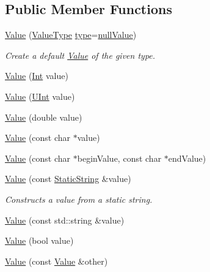 \subsection*{Public Member Functions}
\begin{DoxyCompactItemize}
\item 
\hyperlink{classJson_1_1Value_ada6ba1369448fb0240bccc36efaa46f7}{Value} (\hyperlink{namespaceJson_a7d654b75c16a57007925868e38212b4e}{Value\-Type} \hyperlink{classJson_1_1Value_a695ef31fad36b4712918b3ff80158479}{type}=\hyperlink{namespaceJson_a7d654b75c16a57007925868e38212b4ea99922f3ccd58446e80e6055a7119b640}{null\-Value})
\begin{DoxyCompactList}\small\item\em Create a default \hyperlink{classJson_1_1Value}{Value} of the given type. \end{DoxyCompactList}\item 
\hyperlink{classJson_1_1Value_a4744ae571fcf34f4b16a2257b3b3b585}{Value} (\hyperlink{classJson_1_1Value_abdf7a7ff73eb130ffcab28504ffdb405}{Int} value)
\item 
\hyperlink{classJson_1_1Value_ae67a857b01286e3499a87e95be848d20}{Value} (\hyperlink{classJson_1_1Value_a0933d59b45793ae4aade1757c322a98d}{U\-Int} value)
\item 
\hyperlink{classJson_1_1Value_a32228cc84d83200cca8441451997996c}{Value} (double value)
\item 
\hyperlink{classJson_1_1Value_ad87b849356816aca75995dd07302e49d}{Value} (const char $\ast$value)
\item 
\hyperlink{classJson_1_1Value_a13e567d467bb1e699d71e27a76b0e988}{Value} (const char $\ast$begin\-Value, const char $\ast$end\-Value)
\item 
\hyperlink{classJson_1_1Value_a081830e95f88a37054da7e46c65b0766}{Value} (const \hyperlink{classJson_1_1StaticString}{Static\-String} \&value)
\begin{DoxyCompactList}\small\item\em Constructs a value from a static string. \end{DoxyCompactList}\item 
\hyperlink{classJson_1_1Value_aa4501dd4edf3ce3d5145fc656f088b21}{Value} (const std\-::string \&value)
\item 
\hyperlink{classJson_1_1Value_a350a31ea4a30d384994b0bc010b17495}{Value} (bool value)
\item 
\hyperlink{classJson_1_1Value_a436dfd3670f95fd665f680eba5cebcf0}{Value} (const \hyperlink{classJson_1_1Value}{Value} \&other)

\end{DoxyCompactItemize}
